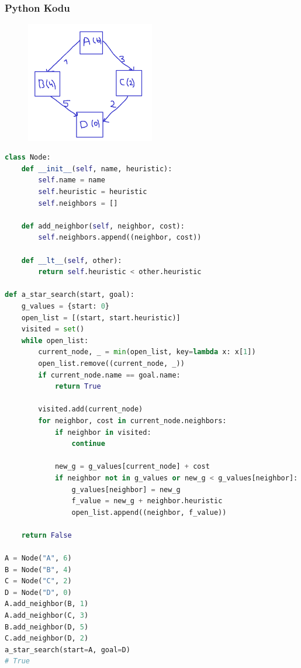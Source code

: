 \subsubsection{Python Kodu}

\begin{figure}[h]
    \centering
    \includegraphics[width=0.5\textwidth]{images/a_start_search.png}
    \caption{}
\end{figure}

\begin{lstlisting}[language=Python]
class Node:
    def __init__(self, name, heuristic):
        self.name = name
        self.heuristic = heuristic
        self.neighbors = []

    def add_neighbor(self, neighbor, cost):
        self.neighbors.append((neighbor, cost))

    def __lt__(self, other):
        return self.heuristic < other.heuristic

def a_star_search(start, goal):
    g_values = {start: 0}
    open_list = [(start, start.heuristic)]
    visited = set()
    while open_list:
        current_node, _ = min(open_list, key=lambda x: x[1])
        open_list.remove((current_node, _))
        if current_node.name == goal.name:
            return True

        visited.add(current_node)
        for neighbor, cost in current_node.neighbors:
            if neighbor in visited:
                continue 

            new_g = g_values[current_node] + cost
            if neighbor not in g_values or new_g < g_values[neighbor]:
                g_values[neighbor] = new_g
                f_value = new_g + neighbor.heuristic
                open_list.append((neighbor, f_value))

    return False

A = Node("A", 6)
B = Node("B", 4)
C = Node("C", 2)
D = Node("D", 0)
A.add_neighbor(B, 1)
A.add_neighbor(C, 3)
B.add_neighbor(D, 5)
C.add_neighbor(D, 2)
a_star_search(start=A, goal=D)
# True
\end{lstlisting}

